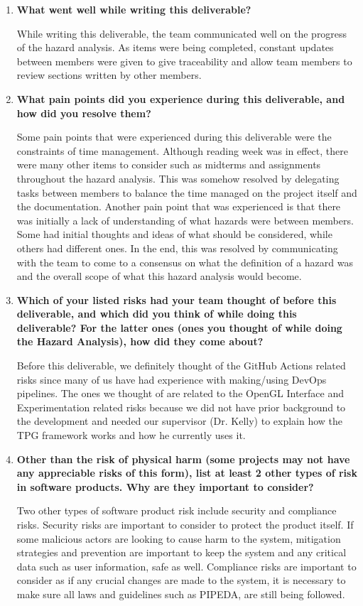 \documentclass{article}
\begin{document}
\begin{enumerate}
    \item \textbf{What went well while writing this deliverable?}

While writing this deliverable, the team communicated well on the progress of the hazard analysis. As items were being completed, constant updates between members were given to give traceability and allow team members to review sections written by other members. 
 
    \item \textbf{What pain points did you experience during this deliverable, and how
    did you resolve them?}

Some pain points that were experienced during this deliverable were the constraints of time management. Although reading week was in effect, there were many other items to consider such as midterms and assignments throughout the hazard analysis. This was somehow resolved by delegating tasks between members to balance the time managed on the project itself and the documentation. Another pain point that was experienced is that there was initially a lack of understanding of what hazards were between members. Some had initial thoughts and ideas of what should be considered, while others had different ones. In the end, this was resolved by communicating with the team to come to a consensus on what the definition of a hazard was and the overall scope of what this hazard analysis would become.


    \item \textbf{Which of your listed risks had your team thought of before this
    deliverable, and which did you think of while doing this deliverable? For
    the latter ones (ones you thought of while doing the Hazard Analysis), how
    did they come about?}

Before this deliverable, we definitely thought of the GitHub Actions related risks since many of us have had experience with making/using DevOps pipelines. The ones we thought of are related to the OpenGL Interface and Experimentation related risks because we did not have prior background to the development and needed our supervisor (Dr. Kelly) to explain how the TPG framework works and how he currently uses it. 

    \item \textbf{Other than the risk of physical harm (some projects may not have any
    appreciable risks of this form), list at least 2 other types of risk in
    software products. Why are they important to consider?}

Two other types of software product risk include security and compliance risks. Security risks are important to consider to protect the product itself. If some malicious actors are looking to cause harm to the system, mitigation strategies and prevention are important to keep the system and any critical data such as user information, safe as well. Compliance risks are important to consider as if any crucial changes are made to the system, it is necessary to make sure all laws and guidelines such as PIPEDA, are still being followed.

\end{enumerate}




\end{document}
